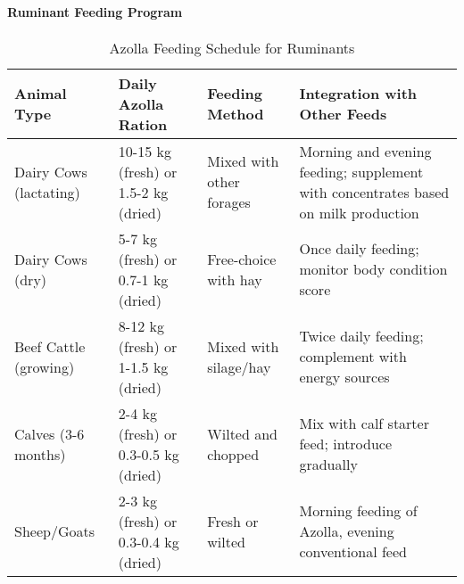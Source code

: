 \paragraph{Ruminant Feeding Program}
\begin{table}[h]
\centering
\caption{Azolla Feeding Schedule for Ruminants}
\label{tab:ruminant_feeding}
\begin{tabular}{|p{4cm}|p{2.5cm}|p{2.5cm}|p{4.5cm}|}
\hline
\textbf{Animal Type} & \textbf{Daily Azolla Ration} & \textbf{Feeding Method} & \textbf{Integration with Other Feeds} \\
\hline
Dairy Cows (lactating) & 10-15 kg (fresh) or 1.5-2 kg (dried) & Mixed with other forages & Morning and evening feeding; supplement with concentrates based on milk production \\
\hline
Dairy Cows (dry) & 5-7 kg (fresh) or 0.7-1 kg (dried) & Free-choice with hay & Once daily feeding; monitor body condition score \\
\hline
Beef Cattle (growing) & 8-12 kg (fresh) or 1-1.5 kg (dried) & Mixed with silage/hay & Twice daily feeding; complement with energy sources \\
\hline
Calves (3-6 months) & 2-4 kg (fresh) or 0.3-0.5 kg (dried) & Wilted and chopped & Mix with calf starter feed; introduce gradually \\
\hline
Sheep/Goats & 2-3 kg (fresh) or 0.3-0.4 kg (dried) & Fresh or wilted & Morning feeding of Azolla, evening conventional feed \\
\hline
\end{tabular}
\end{table}

